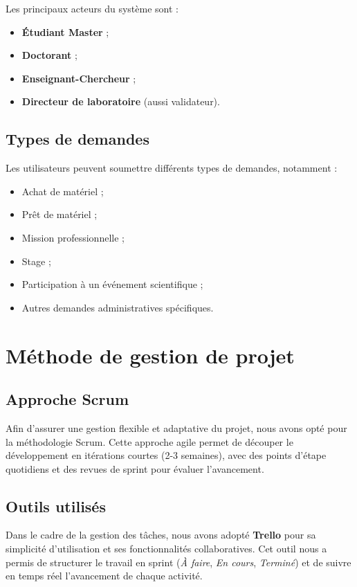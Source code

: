 Les principaux acteurs du système sont :
\begin{itemize}
  \item \textbf{Étudiant Master} ;
  \item \textbf{Doctorant} ;
  \item \textbf{Enseignant-Chercheur} ;
  \item \textbf{Directeur de laboratoire} (aussi validateur).
\end{itemize}

\subsection{Types de demandes}

Les utilisateurs peuvent soumettre différents types de demandes, notamment :
\begin{itemize}
  \item Achat de matériel ;
  \item Prêt de matériel ;
  \item Mission professionnelle ;
  \item Stage ;
  \item Participation à un événement scientifique ;
  \item Autres demandes administratives spécifiques.
\end{itemize}

\section{Méthode de gestion de projet}

\subsection{Approche Scrum}

Afin d'assurer une gestion flexible et adaptative du projet, nous avons opté pour la méthodologie Scrum. Cette approche agile permet de découper le développement en itérations courtes (2-3 semaines), avec des points d'étape quotidiens et des revues de sprint pour évaluer l'avancement.

\subsection{Outils utilisés}

Dans le cadre de la gestion des tâches, nous avons adopté \textbf{Trello} pour sa simplicité d'utilisation et ses fonctionnalités collaboratives. Cet outil nous a permis de structurer le travail en sprint (\textit{À faire}, \textit{En cours}, \textit{Terminé}) et de suivre en temps réel l'avancement de chaque activité.

